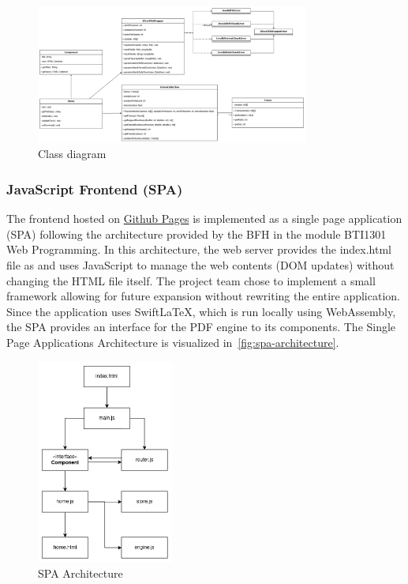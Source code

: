 \begin{figure}[H]
    \centering
    \includegraphics[width=0.8\textwidth]{../assets/class_diagram.png}
    \caption{Class diagram}\label{fig:class-diagram}
\end{figure}

\subsubsection{JavaScript Frontend (SPA)}
The frontend hosted on \href{https://decibel-threshold-event-displayer.github.io/}{Github Pages} is implemented as a single page application (SPA) following the architecture provided by the BFH in the module BTI1301 Web Programming.
In this architecture, the web server provides the index.html file as and uses JavaScript to manage the web contents (DOM updates) without changing the HTML file itself.
The project team chose to implement a small framework allowing for future expansion without rewriting the entire application.
Since the application uses SwiftLaTeX, which is run locally using WebAssembly, the SPA provides an interface for the PDF engine to its components.
The Single Page Applications Architecture is visualized in~\autoref{fig:spa-architecture}.

\begin{figure}[H]
    \centering
    \includegraphics[width=0.4\textwidth]{../assets/spa_diagram.png}
    \caption{SPA Architecture}\label{fig:spa-architecture}
\end{figure}

